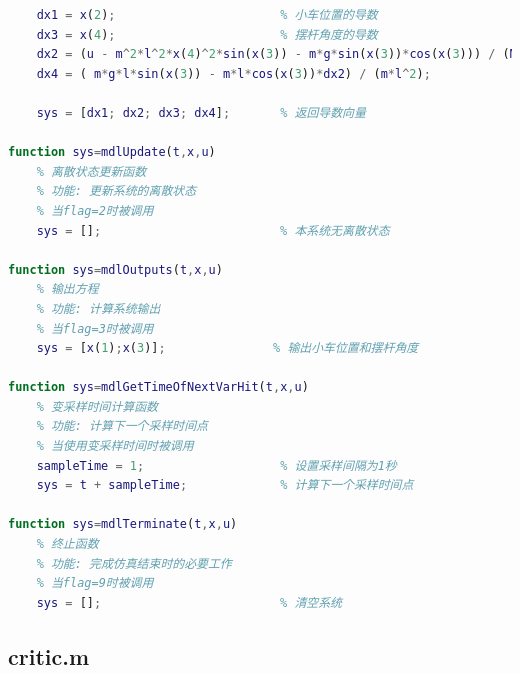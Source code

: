 \documentclass[12pt,a4paper,UTF8]{article}
\begin{document}
\begin{lstlisting}[language=Matlab]
    % 计算状态导数
    dx1 = x(2);                       % 小车位置的导数
    dx3 = x(4);                       % 摆杆角度的导数
    dx2 = (u - m^2*l^2*x(4)^2*sin(x(3)) - m*g*sin(x(3))*cos(x(3))) / (M + m*sin(x(3))^2);  % 小车速度的导数
    dx4 = ( m*g*l*sin(x(3)) - m*l*cos(x(3))*dx2) / (m*l^2);                                 % 摆杆角速度的导数

    sys = [dx1; dx2; dx3; dx4];       % 返回导数向量

function sys=mdlUpdate(t,x,u)
    % 离散状态更新函数
    % 功能: 更新系统的离散状态
    % 当flag=2时被调用
    sys = [];                         % 本系统无离散状态

function sys=mdlOutputs(t,x,u)
    % 输出方程
    % 功能: 计算系统输出
    % 当flag=3时被调用
    sys = [x(1);x(3)];               % 输出小车位置和摆杆角度

function sys=mdlGetTimeOfNextVarHit(t,x,u)
    % 变采样时间计算函数
    % 功能: 计算下一个采样时间点
    % 当使用变采样时间时被调用
    sampleTime = 1;                   % 设置采样间隔为1秒
    sys = t + sampleTime;             % 计算下一个采样时间点

function sys=mdlTerminate(t,x,u)
    % 终止函数
    % 功能: 完成仿真结束时的必要工作
    % 当flag=9时被调用
    sys = [];                         % 清空系统
\end{lstlisting}

\subsection{critic.m}
\end{document}
